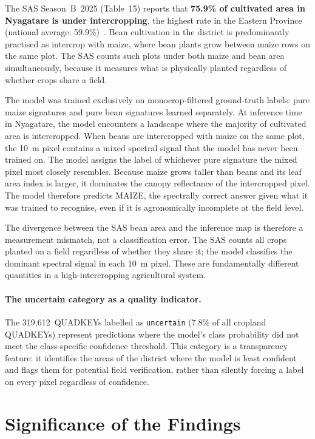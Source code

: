 The SAS Season~B~2025 (Table~15) reports that \textbf{75.9\% of
cultivated area in Nyagatare is under intercropping}, the
highest rate in the Eastern Province (national average:
59.9\%)~\cite{nisr2025sas}. Bean cultivation in the district is
predominantly practised as intercrop with maize, where bean plants
grow between maize rows on the same plot. The SAS counts such
plots under both maize and bean area simultaneously, because it
measures what is physically planted regardless of whether crops
share a field.

The model was trained exclusively on monocrop-filtered ground-truth
labels: pure maize signatures and pure bean signatures learned
separately. At inference time in Nyagatare, the model encounters
a landscape where the majority of cultivated area is intercropped.
When beans are intercropped with maize on the same plot, the 10~m
pixel contains a mixed spectral signal that the model has never
been trained on. The model assigns the label of whichever pure
signature the mixed pixel most closely resembles. Because maize
grows taller than beans and its leaf area index is larger, it
dominates the canopy reflectance of the intercropped pixel. The
model therefore predicts MAIZE, the spectrally correct answer
given what it was trained to recognise, even if it is
agronomically incomplete at the field level.

The divergence between the SAS bean area and the inference map
is therefore a measurement mismatch, not a classification error.
The SAS counts all crops planted on a field regardless of whether
they share it; the model classifies the dominant spectral signal
in each 10~m pixel. These are fundamentally different quantities
in a high-intercropping agricultural system.

\paragraph{The uncertain category as a quality indicator.}
The 319,612~QUADKEYs labelled as \texttt{uncertain} (7.8\% of
all cropland QUADKEYs) represent predictions where the model's
class probability did not meet the class-specific confidence
threshold. This category is a transparency feature: it identifies
the areas of the district where the model is least confident and
flags them for potential field verification, rather than silently
forcing a label on every pixel regardless of confidence.


\section{Significance of the Findings}
\label{sec:significance}


